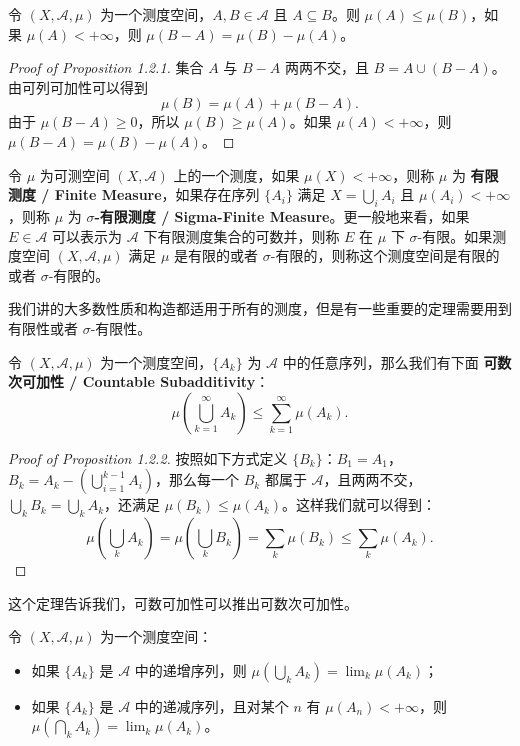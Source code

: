 \documentclass[11pt]{article}
\newcommand{\calA}{\mathcal{A}}
\begin{document}
\begin{proposition}
    令 $(X,\calA,\mu)$ 为一个测度空间，$A,B \in \calA$ 且 $A \subseteq B$。则 $\mu(A) \le \mu(B)$，如果 $\mu(A) < +\infty$，则 $\mu(B-A) = \mu(B) - \mu(A)$。
\end{proposition}

\begin{proof}[Proof of Proposition 1.2.1]
    集合 $A$ 与 $B-A$ 两两不交，且 $B = A \cup (B-A)$。由可列可加性可以得到
    \[
        \mu(B) = \mu(A) + \mu(B-A).
    \]
    由于 $\mu(B-A) \ge 0$，所以 $\mu(B) \ge \mu(A)$。如果 $\mu(A) < +\infty$，则 $\mu(B-A) = \mu(B) - \mu(A)$。
\end{proof}

令 $\mu$ 为可测空间 $(X,\calA)$ 上的一个测度，如果 $\mu(X) < +\infty$，则称 $\mu$ 为 {\normalfont\bfseries 有限测度 / Finite Measure}，如果存在序列 $\{A_i\}$ 满足 $X = \bigcup_i A_i$ 且 $\mu(A_i) < +\infty$，则称 $\mu$ 为 {\normalfont\bfseries $\sigma$-有限测度 / Sigma-Finite Measure}。更一般地来看，如果 $E \in \calA$ 可以表示为 $\calA$ 下有限测度集合的可数并，则称 $E$ 在 $\mu$ 下 $\sigma$-有限。如果测度空间 $(X,\calA,\mu)$ 满足 $\mu$ 是有限的或者 $\sigma$-有限的，则称这个测度空间是有限的或者 $\sigma$-有限的。

我们讲的大多数性质和构造都适用于所有的测度，但是有一些重要的定理需要用到有限性或者 $\sigma$-有限性。

\begin{proposition}
    令 $(X,\calA,\mu)$ 为一个测度空间，$\{A_k\}$ 为 $\calA$ 中的任意序列，那么我们有下面 {\normalfont\bfseries 可数次可加性 / Countable Subadditivity}：
    \[
        \mu\left(\bigcup_{k=1}^{\infty} A_k\right) \le \sum_{k=1}^{\infty} \mu(A_k).
    \]
\end{proposition}

\begin{proof}[Proof of Proposition 1.2.2]
    按照如下方式定义 $\{B_k\}$：$B_1=A_1$，$B_k=A_k-\left(\bigcup_{i=1}^{k-1} A_i\right)$，那么每一个 $B_k$ 都属于 $\calA$，且两两不交，$\bigcup_k B_k = \bigcup_k A_k$，还满足 $\mu(B_k) \le \mu(A_k)$。这样我们就可以得到：
    \[
        \mu\left(\bigcup_k A_k\right)
        = \mu\left(\bigcup_k B_k\right)
        = \sum_k \mu(B_k)
        \le \sum_k \mu(A_k).
    \]
\end{proof}

这个定理告诉我们，可数可加性可以推出可数次可加性。

\begin{proposition}\label{Proposition-1-2-3}
    令 $(X,\calA,\mu)$ 为一个测度空间：
    \begin{itemize}
        \item 如果 $\{A_k\}$ 是 $\calA$ 中的递增序列，则 $\mu\left(\bigcup_k A_k\right) = \lim_k \mu(A_k)$；
        \item 如果 $\{A_k\}$ 是 $\calA$ 中的递减序列，且对某个 $n$ 有 $\mu(A_n) < +\infty$，则 $\mu\left(\bigcap_k A_k\right) = \lim_k \mu(A_k)$。
    \end{itemize}
\end{proposition}
\end{document}
